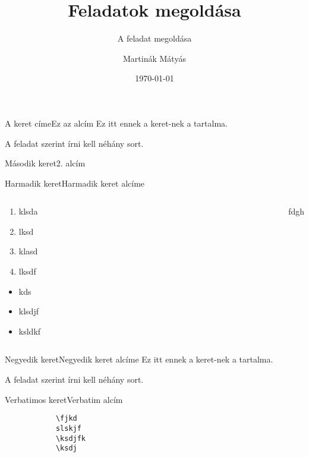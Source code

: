 \documentclass[aspectratio=169, bigger, xcolor={table}]{beamer}
\author{Martinák Mátyás}
\title{Feladatok megoldása}
\subtitle{A feladat megoldása}
\institute{Miskolci Egyetem}
\date{\today}
\begin{document}
	\maketitle
	
	\begin{frame}{A keret címe}{Ez az alcím}
		Ez itt ennek a keret-nek a tartalma.
		
		A feladat szerint írni kell néhány sort.
	\end{frame}
	
	\begin{frame}[allowframebreaks]{Második keret}{2. alcím}
		\hulipsum
	\end{frame}
	
	\begin{frame}{Harmadik keret}{Harmadik keret alcíme}
		\begin{columns}[c]
			
			\begin{column}{0.5\linewidth}
				\begin{enumerate}
					\item klsda
					\item lksd
					\item klasd
					\item lksdf
				\end{enumerate}
				
				\begin{itemize}
					\item kds
					\item klsdjf
					\item ksldkf
				\end{itemize}
			\end{column}
			
			\begin{column}{0.5\linewidth}
				
			\end{column}
			fdgh
		\end{columns}
	\end{frame}
	
	\begin{frame}{Negyedik keret}{Negyedik keret alcíme}
		Ez itt ennek a keret-nek a tartalma.
		
		A feladat szerint írni kell néhány sort.
	\end{frame}
	
	\begin{frame}[fragile]{Verbatimos keret}{Verbatim alcím}
		
		\begin{verbatim}
			\fjkd
			slskjf
			\ksdjfk
			\ksdj
		\end{verbatim}
		
	\end{frame}
	
\end{document}
